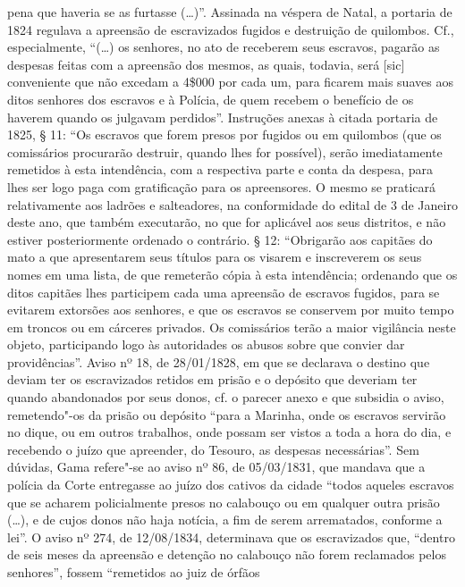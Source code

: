 {  pena que haveria se as furtasse (\ldots{})''. Assinada na véspera de Natal,
  a portaria de 1824 regulava a apreensão de escravizados fugidos e
  destruição de quilombos. Cf., especialmente, ``(\ldots{}) os senhores, no ato
  de receberem seus escravos, pagarão as despesas feitas com a apreensão
  dos mesmos, as quais, todavia, será {[}sic{]} conveniente que não
  excedam a 4\$000 por cada um, para ficarem mais suaves aos ditos
  senhores dos escravos e à Polícia, de quem recebem o benefício de os
  haverem quando os julgavam perdidos''. Instruções anexas à citada
  portaria de 1825, § 11: ``Os escravos que forem presos por fugidos ou
  em quilombos (que os comissários procurarão destruir, quando lhes for
  possível), serão imediatamente remetidos à esta intendência, com a
  respectiva parte e conta da despesa, para lhes ser logo paga com
  gratificação para os apreensores. O mesmo se praticará relativamente
  aos ladrões e salteadores, na conformidade do edital de 3 de Janeiro
  deste ano, que também executarão, no que for aplicável aos seus
  distritos, e não estiver posteriormente ordenado o contrário. § 12:
  ``Obrigarão aos capitães do mato a que apresentarem seus títulos para
  os visarem e inscreverem os seus nomes em uma lista, de que remeterão
  cópia à esta intendência; ordenando que os ditos capitães lhes
  participem cada uma apreensão de escravos fugidos, para se evitarem
  extorsões aos senhores, e que os escravos se conservem por muito tempo
  em troncos ou em cárceres privados. Os comissários terão a maior
  vigilância neste objeto, participando logo às autoridades os abusos
  sobre que convier dar providências''. Aviso nº 18, de 28/01/1828, em
  que se declarava o destino que deviam ter os escravizados retidos em
  prisão e o depósito que deveriam ter quando abandonados por seus
  donos, cf. o parecer anexo e que subsidia o aviso, remetendo"-os da
  prisão ou depósito ``para a Marinha, onde os escravos servirão no
  dique, ou em outros trabalhos, onde possam ser vistos a toda a hora do
  dia, e recebendo o juízo que apreender, do Tesouro, as despesas
  necessárias''. Sem dúvidas, Gama refere"-se ao aviso nº 86, de
  05/03/1831, que mandava que a polícia da Corte entregasse ao juízo dos
  cativos da cidade ``todos aqueles escravos que se acharem
  policialmente presos no calabouço ou em qualquer outra prisão (\ldots{}), e
  de cujos donos não haja notícia, a fim de serem arrematados, conforme
  a lei''. O aviso nº 274, de 12/08/1834, determinava que os escravizados
  que, ``dentro de seis meses da apreensão e detenção no calabouço não
  forem reclamados pelos senhores'', fossem ``remetidos ao juiz de órfãos
}

